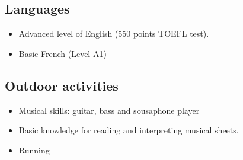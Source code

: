 \documentclass[letterpaper]{twentysecondcv} %
\begin{document}
\subsection{Languages}
\begin{itemize}
\item Advanced level of English (550 points TOEFL test).
\item Basic French (Level A1)
\end{itemize}

\subsection{Outdoor activities}
\begin{itemize}
\item  Musical skills: guitar, bass and sousaphone player
\item Basic knowledge for reading and interpreting musical sheets. 
\item Running 
\end{itemize}







\end{document}
